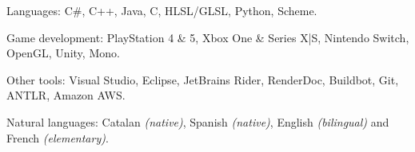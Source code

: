 \documentclass[10pt,a4paper]{article} %
\begin{document}

\inlineheadsection %
{Languages:}
{C\#, C++, Java, C, HLSL/GLSL, Python, Scheme.}


\inlineheadsection %
{Game development:}
{PlayStation 4 \& 5, Xbox One \& Series X|S, Nintendo Switch, OpenGL, Unity, Mono.}


\inlineheadsection %
{Other tools:}
{Visual Studio, Eclipse, JetBrains Rider, RenderDoc, Buildbot, Git, ANTLR, Amazon AWS.}


\inlineheadsection %
{Natural languages:}
{Catalan \textit{(native)}, Spanish \textit{(native)}, English \textit{(bilingual)} and French \textit{(elementary)}.}

\end{document}
